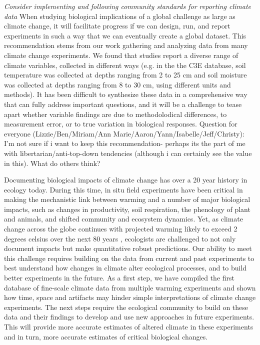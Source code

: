 \documentclass{article}
\begin{document}
\par\textit{Consider implementing and following community standards for reporting climate data} 
When studying biological implications of a global challenge as large as climate change, it will facilitate progress if we can design, run, and report experiments in such a way that we can eventually create a global dataset. This recommendation stems from our work gathering and analyzing data from many climate change experiments. We found that studies report a diverse range of climate variables, collected in different ways (e.g. in the the C3E database, soil temperature was collected at depths ranging from 2 to 25 cm and soil moisture was collected at depths ranging from 8 to 30 cm, using different units and methods). It has been difficult to synthesize these data in a comprehensive way that can fully address important questions, and it will be a challenge to tease apart whether variable findings are due to methodolodical differences, to measurement error, or to true variation in biological responses. Question for everyone (Lizzie/Ben/Miriam/Ann Marie/Aaron/Yann/Isabelle/Jeff/Christy): I'm not sure if i want to keep this recommendation- perhaps its the part of me with libertarian/anti-top-down tendencies (although i can certainly see the value in this). What do others think?

\par Documenting biological impacts of climate change has over a 20 year history in ecology today. During this time, in situ field experiments have been critical in making the mechanistic link between warming and a number of major biological impacts, such as changes in productivity, soil respiration, the phenology of plant and animals, and shifted community and ecosystem dynamics. Yet, as climate change across the globe continues with projected warming likely to exceed 2 degrees celsius over the next 80 years \citep{ipcc2013}, ecologists are challenged to not only document impacts but make quantitative robust predictions. Our ability to meet this challenge requires building on the data from current and past experiments to best understand how changes in climate alter ecological processes, and to build better experiments in the future. As a first step, we have compiled the first database of fine-scale climate data from multiple warming experiments and shown how time, space and artifacts may hinder simple interpretations of climate change experiments. The next steps require the ecological community to build on these data and their findings to develop and use new approaches in future experiments. This will provide more accurate estimates of altered climate in these experiments and in turn, more accurate estimates of critical biological changes. 
\end{document}
